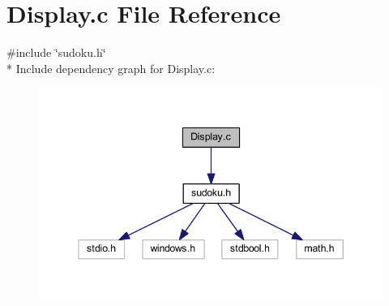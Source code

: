 \section{Display.\+c File Reference}
\label{_display_8c}
{\ttfamily \#include \char`\"{}sudoku.\+h\char`\"{}}\\*
Include dependency graph for Display.\+c\+:
\nopagebreak
\begin{figure}[H]
\begin{center}
\leavevmode
\includegraphics[width=345pt]{_display_8c__incl}
\end{center}
\end{figure}
